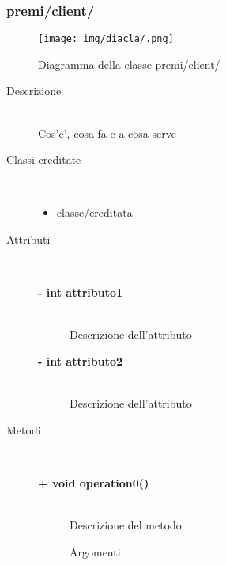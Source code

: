 \subsubsection{premi/client/}
\begin{figure}[h]
\begin{center}
\texttt{[image: img/diacla/.png]}
\caption{Diagramma della classe premi/client/}
\end{center}
\end{figure}




\begin{description}
\item[Descrizione] \hfill \\
	Cos'e', cosa fa e a cosa serve
	
	
\item[Classi ereditate] \hfill \\
	\begin{itemize}
		\item classe/ereditata
	\end{itemize}
	
	
\item[Attributi] \hfill \\
	\begin{description}
		\item[\textbf{- int attributo1			}] \hfill \\
			Descrizione dell'attributo
		\item[\textbf{- int attributo2			}] \hfill \\
			Descrizione dell'attributo
	\end{description}
	
	
\item[Metodi] \hfill \\

	\begin{description}
		\item[\textbf{\color{blue}+ void operation0()			}] \hfill \\
			Descrizione del metodo
			
		\begin{description}
			\item[Argomenti] \hfill \\
				\begin{itemize}
				

\end{itemize}
\end{description}
\end{description}
\end{description}
